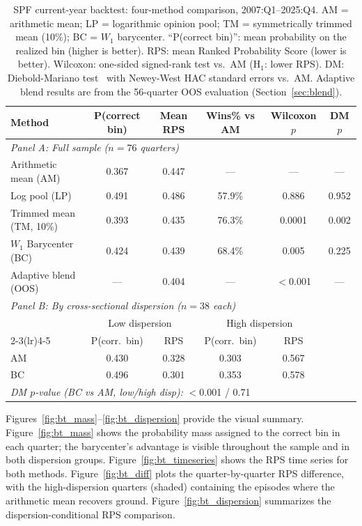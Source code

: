 \begin{table}[ht]
\centering
\caption{SPF current-year backtest: four-method comparison, 2007:Q1--2025:Q4.  AM = arithmetic mean; LP = logarithmic opinion pool; TM = symmetrically trimmed mean (10\%); BC = $W_1$ barycenter.  ``P(correct bin)'': mean probability on the realized bin (higher is better).  RPS: mean Ranked Probability Score (lower is better).  Wilcoxon: one-sided signed-rank test vs.\ AM (H$_1$: lower RPS).  DM: Diebold-Mariano test~\cite{diebold95} with Newey-West HAC standard errors vs.\ AM.  Adaptive blend results are from the 56-quarter OOS evaluation (Section~\ref{sec:blend}).}
\label{tab:backtest}
\smallskip
\begin{tabular}{lccccc}
\hline
Method & P(correct bin) & Mean RPS & Wins\% vs AM & Wilcoxon $p$ & DM $p$ \\
\hline
\multicolumn{6}{l}{\textit{Panel A: Full sample ($n = 76$ quarters)}} \\[2pt]
Arithmetic mean (AM)         & 0.367 & 0.447 & ---    & ---    & ---    \\
Log pool (LP)                & 0.491 & 0.486 & 57.9\% & 0.886  & 0.952  \\
Trimmed mean (TM, 10\%)      & 0.393 & 0.435 & 76.3\% & 0.0001 & 0.002  \\
$W_1$ Barycenter (BC)        & 0.424 & 0.439 & 68.4\% & 0.005  & 0.225  \\
Adaptive blend (OOS)         & ---   & 0.404 & ---    & $<$0.001 & ---  \\[4pt]
\multicolumn{6}{l}{\textit{Panel B: By cross-sectional dispersion ($n = 38$ each)}} \\[2pt]
 & \multicolumn{2}{c}{Low dispersion} & \multicolumn{2}{c}{High dispersion} & \\
\cmidrule(lr){2-3}\cmidrule(lr){4-5}
 & P(corr.\ bin) & RPS & P(corr.\ bin) & RPS & \\
\hline
AM  & 0.430 & 0.328 & 0.303 & 0.567 & \\
BC  & 0.496 & 0.301 & 0.353 & 0.578 & \\
\hline
\multicolumn{6}{l}{\textit{DM $p$-value (BC vs AM, low/high disp):} $<$0.001 / 0.71} \\
\hline
\end{tabular}
\end{table}

Figures~\ref{fig:bt_mass}--\ref{fig:bt_dispersion} provide the visual summary.  Figure~\ref{fig:bt_mass} shows the probability mass assigned to the correct bin in each quarter; the barycenter's advantage is visible throughout the sample and in both dispersion groups.  Figure~\ref{fig:bt_timeseries} shows the RPS time series for both methods.  Figure~\ref{fig:bt_diff} plots the quarter-by-quarter RPS difference, with the high-dispersion quarters (shaded) containing the episodes where the arithmetic mean recovers ground.  Figure~\ref{fig:bt_dispersion} summarizes the dispersion-conditional RPS comparison.

